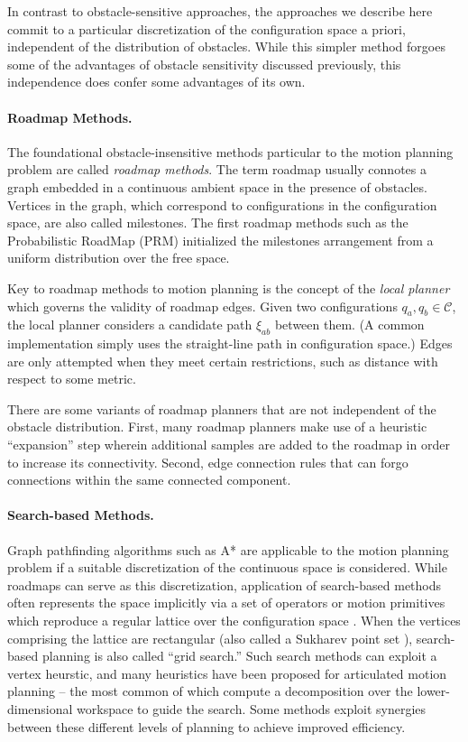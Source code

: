 In contrast to obstacle-sensitive approaches,
the approaches we describe here
commit to a particular discretization
of the configuration space a priori,
independent of the distribution of obstacles.
While this simpler method forgoes some of the advantages of
obstacle sensitivity discussed previously,
this independence does confer some advantages of its own.

\paragraph{Roadmap Methods.}

The foundational obstacle-insensitive methods particular to the motion
planning problem are called \emph{roadmap methods}.
The term roadmap usually connotes a graph embedded in a continuous
ambient space in the presence of obstacles.
Vertices in the graph,
which correspond to configurations in the configuration space,
are also called milestones.
The first roadmap methods such as the
Probabilistic RoadMap (PRM) \citep{kavrakietal1996prm}
initialized the milestones arrangement
from a uniform distribution over the free space.

Key to roadmap methods to motion planning
is the concept of the \emph{local planner}
which governs the validity of roadmap edges.
Given two configurations $q_a, q_b \in \mathcal{C}$,
the local planner considers a candidate path $\xi_{ab}$ between
them.
(A common implementation simply uses the straight-line path
in configuration space.)
Edges are only attempted when they meet certain restrictions,
such as distance with respect to some metric.

There are some variants of roadmap planners that are not independent
of the obstacle distribution.
First,
many roadmap planners make use of a heuristic ``expansion'' step
wherein additional samples are added to the roadmap
in order to increase its connectivity.
Second,
edge connection rules that can forgo connections within
the same connected component.


\paragraph{Search-based Methods.}
Graph pathfinding algorithms such as A* \citep{hart1968astar}
are applicable to the motion planning problem if a suitable
discretization of the continuous space is considered.
While roadmaps can serve as this discretization,
application of search-based methods often represents the space
implicitly via a set of operators or motion primitives
which reproduce a regular lattice over the configuration space
\citep{pivtoraiko2005statelattice}.
When the vertices comprising the lattice are rectangular
(also called a Sukharev point set \citep{sukharev1971extremum}),
search-based planning is also called ``grid search.''
Such search methods can exploit a vertex heurstic,
and many heuristics have been proposed for articulated motion planning
-- the most common of which compute a decomposition over the
lower-dimensional workspace to guide the search.
Some methods \citep{plaku2010syclop} exploit synergies between these
different levels of planning to achieve improved efficiency.

